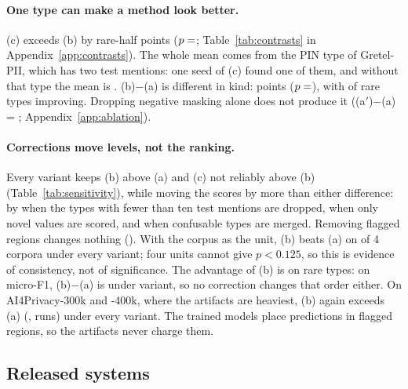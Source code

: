 \documentclass[11pt]{article}
\begin{document}
\paragraph{One type can make a method look better.}
(c) exceeds (b) by  rare-half points ($p=\rt{cbp}$;
Table~\ref{tab:contrasts} in Appendix~\ref{app:contrasts}). The whole
mean comes from the PIN type of Gretel-PII, which has two test mentions:
one seed of (c) found one of them, and without that type the mean is
. (b)$-$(a) is different in kind:  points
($p=\rt{bap}$), with  of  rare types improving.
Dropping negative masking alone does not produce it ((a$'$)$-$(a) =
; Appendix~\ref{app:ablation}).

\paragraph{Corrections move levels, not the ranking.}
Every variant keeps (b) above (a) and (c) not reliably above (b)
(Table~\ref{tab:sensitivity}), while moving the scores by more than
either difference: by  when the 
types with fewer than ten test mentions are dropped,  when
only novel values are scored, and  when confusable types
are merged. Removing flagged regions changes nothing ().
With the corpus as the unit, (b) beats (a) on  of 4
corpora under every variant; four units cannot give $p<0.125$, so this
is evidence of consistency, not of significance. The advantage of
(b) is on rare types: on micro-F1, (b)$-$(a) is  under
 variant, so no correction changes that order either. On AI4Privacy-300k and
-400k, where the artifacts are heaviest, (b) again exceeds (a)
(,  runs) under every variant. The trained models
place  predictions in flagged regions, so the
artifacts never charge them.

\subsection{Released systems}
\label{sec:released}

\begin{table}[t]
\centering
\small
\setlength{\tabcolsep}{5pt}
\caption{Released systems without further training: rare-half macro-F1
at threshold 0.5. Bold: best; $^\ast$: trained on this corpus. The last
column lists the variants that change the best system.}
\label{tab:offshelf}
\end{table}
\end{document}
